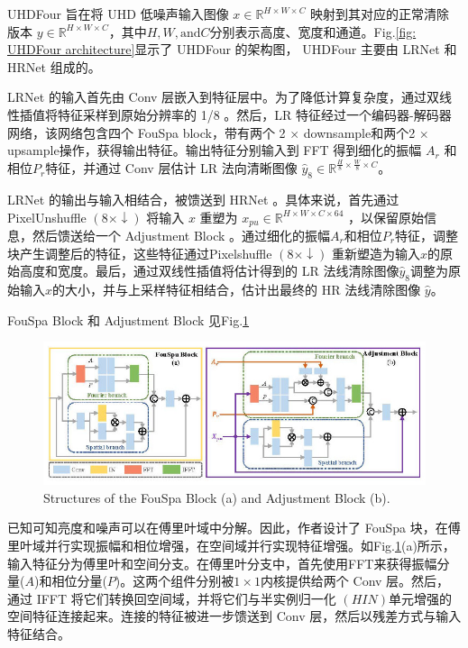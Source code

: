 \documentclass[letterpaper,10pt]{article}
\begin{document}
	UHDFour 旨在将 UHD 低噪声输入图像 $x \in \mathbb{R}^{H \times W \times C}$ 映射到其对应的正常清除版本 $y \in \mathbb{R}^{H \times W \times C}$，其中$H, W, \text{and} C$分别表示高度、宽度和通道。Fig.\ref{fig: UHDFour architecture}显示了 UHDFour 的架构图， UHDFour 主要由 LRNet 和 HRNet 组成的。
	
	LRNet 的输入首先由 Conv 层嵌入到特征层中。为了降低计算复杂度，通过双线性插值将特征采样到原始分辨率的 1/8 。然后，LR 特征经过一个编码器-解码器网络，该网络包含四个 FouSpa block，带有两个 2 $\times$ downsample和两个2 $\times$ upsample操作，获得输出特征。输出特征分别输入到 FFT 得到细化的振幅 $A_r$ 和相位$P_r$特征，并通过 Conv 层估计 LR 法向清晰图像 $\hat{y}_8 \in \mathbb{R}^{\frac{H}{8} \times \frac{W}{8} \times C}$。
	
	LRNet 的输出与输入相结合，被馈送到 HRNet 。具体来说，首先通过 PixelUnshuffle $\left(8 \times \downarrow\right)$ 将输入 $x$ 重塑为 $x_{pu} \in \mathbb{R}^{H \times W \times C \times 64}$ ，以保留原始信息，然后馈送给一个 Adjustment Block 。通过细化的振幅$A_r$和相位$P_r$特征，调整块产生调整后的特征，这些特征通过Pixelshuffle $\left(8 \times \downarrow\right)$ 重新塑造为输入$x$的原始高度和宽度。最后，通过双线性插值将估计得到的 LR 法线清除图像$\hat{y}_8$调整为原始输入$x$的大小，并与上采样特征相结合，估计出最终的 HR 法线清除图像 $\hat{y}$。
		
	FouSpa Block 和 Adjustment Block 见Fig.\ref{fig: FouSpa and Adjustment}
	
	\begin{figure}[htbp]
		\centering 
		\includegraphics[width=0.8\columnwidth]{picture/FouSpa-and-Adjustment}
		\caption{
			\label{fig: FouSpa and Adjustment} Structures of the FouSpa Block (a) and Adjustment Block (b).
		}
	\end{figure}
	
	已知可知亮度和噪声可以在傅里叶域中分解。因此，作者设计了 FouSpa 块，在傅里叶域并行实现振幅和相位增强，在空间域并行实现特征增强。如Fig.\ref{fig: FouSpa and Adjustment}(a)所示，输入特征分为傅里叶和空间分支。在傅里叶分支中，首先使用FFT来获得振幅分量($A$)和相位分量($P$)。这两个组件分别被$1 \times 1$内核提供给两个 Conv 层。然后，通过 IFFT 将它们转换回空间域，并将它们与半实例归一化 $(HIN)$单元增强的空间特征连接起来。连接的特征被进一步馈送到 Conv 层，然后以残差方式与输入特征结合。
	
\end{document}
